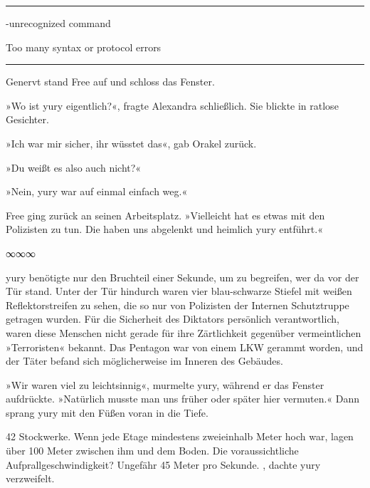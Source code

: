 \noindent \parbox{\textwidth}{ \vspace{3ex} \hrule \vspace{3ex}

    \begin{tiny}
    \begin{ttfamily}

-unrecognized command

 Too many syntax or protocol errors

    \end{ttfamily}
    \end{tiny}

\vspace{3ex} \hrule \vspace{3ex} }

Genervt stand Free auf und schloss das Fenster.

»Wo ist yury eigentlich?«, fragte Alexandra schließlich. Sie blickte in ratlose Gesichter.

»Ich war mir sicher, ihr wüsstet das«, gab Orakel zurück.

»Du weißt es also auch nicht?«

»Nein, yury war auf einmal einfach weg.«

Free ging zurück an seinen Arbeitsplatz. »Vielleicht hat es etwas mit den Polizisten zu tun. Die haben uns abgelenkt und heimlich yury entführt.«

\begin{center}
	∞∞∞
\end{center}

yury benötigte nur den Bruchteil einer Sekunde, um zu begreifen, wer da vor der Tür stand. Unter der Tür hindurch waren vier blau-schwarze Stiefel mit weißen Reflektorstreifen zu sehen, die so nur von Polizisten der Internen Schutztruppe getragen wurden. Für die Sicherheit des Diktators persönlich verantwortlich, waren diese Menschen nicht gerade für ihre Zärtlichkeit gegenüber vermeintlichen »Terroristen« bekannt. Das Pentagon war von einem LKW gerammt worden, und der Täter befand sich möglicherweise im Inneren des Gebäudes.

»Wir waren viel zu leichtsinnig«, murmelte yury, während er das Fenster aufdrückte. »Natürlich musste man uns früher oder später hier vermuten.« Dann sprang yury mit den Füßen voran in die Tiefe.

42 Stockwerke. Wenn jede Etage mindestens zweieinhalb Meter hoch war, lagen über 100 Meter zwischen ihm und dem Boden. Die voraussichtliche Aufprallgeschwindigkeit? Ungefähr 45 Meter pro Sekunde. , dachte yury verzweifelt. 

